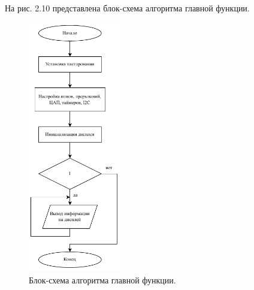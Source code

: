 	
	На рис. 2.10 представлена блок-схема алгоритма главной функции.
	
	\begin{figure}[H]
    \centering
    \includegraphics[width=0.36\textwidth]{../image/main.pdf}
    \caption{Блок-схема алгоритма главной функции.}
	\end{figure}
	
